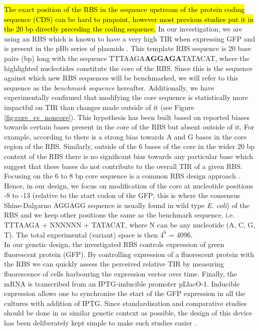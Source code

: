 \documentclass{article}
\begin{document}
\hl{The exact position of the RBS in the sequence upstream of the protein coding sequence (CDS) can be hard to pinpoint, however most previous studies put it in the 20 bp directly preceding the coding sequence.}
In our investigation, we are using an RBS which is known to have a very high TIR when expressing GFP and is present in the pBb series of plasmids \cite{Lee2011}.
This template RBS sequence is 20 base pairs (bp) long with the sequence TTTAAGA\textbf{AGGAGA}TATACAT, where the highlighted nucleotides constitute the core of the RBS.
Since this is the sequence against which new RBS sequences will be benchmarked,
we will refer to this sequence as the \textit{benchmark sequence} hereafter.
Additionally, we have experimentally confirmed that modifying the core sequence is statistically more impactful on TIR than changes made outside of it (see Figure \ref{fig:core_vs_noncore}).
This hypothesis has been built based on reported biases towards certain bases present in the core of the RBS but absent outside of it.
For example, according to \cite{SHULTZABERGER2001} there is a strong bias towards A and G bases in the core region of the RBS.
Similarly, outside of the 6 bases of the core in the wider 20 bp context of the RBS there is no significant bias towards any particular base which suggest that these bases do not contribute to the overall TIR of a given RBS.
Focusing on the 6 to 8 bp core sequence is a common RBS design approach \cite{Jeschek2016}.
Hence, in our design, we focus on modification of the core at nucleotide positions -8 to -13 (relative to the start codon of the GFP; this is where the consensus Shine-Dalgarno AGGAGG sequence is usually found in wild type \textit{E. coli}) of the RBS and we keep other positions the same as the benchmark sequence, i.e. TTTAAGA + NNNNNN + TATACAT, where N can be any nucleotide (A, C, G, T).
The total experimental (variant) space is then $4^6$ = 4096.\\

In our genetic design, the investigated RBS controls expression of green fluorescent protein (GFP).
By controlling expression of a fluorescent protein with the RBS we can quickly assess the perceived relative TIR by measuring fluorescence of cells harbouring the expression vector over time.
Finally, the mRNA is transcribed from an IPTG-inducible promoter pLlacO-1.
Inducible expression allows one to synchronise the start of the GFP expression in all the cultures with addition of IPTG.
Since standardisation and comparative studies should be done in as similar genetic context as possible, the design of this device has been deliberately kept simple to make such studies easier \cite{Beal2021}.\\
\end{document}
